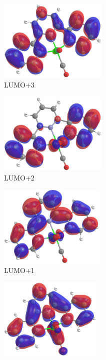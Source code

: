 \begin{figure}[!ht]
 \centering
 \begin{subfigure}[b]{0.31\textwidth}
  \includegraphics[clip=true, width=\textwidth, height=39mm, keepaspectratio]{images/mos/2l+3.eps}
  \caption{LUMO+3}
 \end{subfigure}
 \begin{subfigure}[b]{0.31\textwidth}
  \includegraphics[clip=true, width=\textwidth, height=39mm, keepaspectratio]{images/mos/2l+2.eps}
  \caption{LUMO+2}
 \end{subfigure}
  \begin{subfigure}[b]{0.31\textwidth}
  \includegraphics[clip=true, width=\textwidth, height=39mm, keepaspectratio]{images/mos/2l+1.eps}
  \caption{LUMO+1}
 \end{subfigure}
  \begin{subfigure}[b]{0.31\textwidth}
  \includegraphics[clip=true, width=\textwidth, height=39mm, keepaspectratio]{images/mos/2l.eps}

\end{subfigure}
\end{figure}
